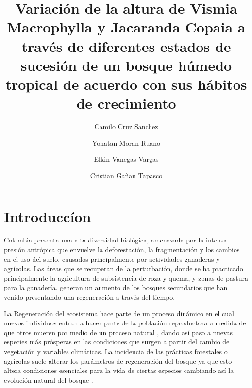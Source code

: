 \documentclass[letterpaper,9pt,onecolumn,twoside,]{pinp}
\title{Variación de la altura de Vismia Macrophylla y Jacaranda Copaia a través
de diferentes estados de sucesión de un bosque húmedo tropical de
acuerdo con sus hábitos de crecimiento}
\author[a]{Camilo Cruz Sanchez}
\author[a]{Yonatan Moran Ruano}
\author[a]{Elkin Vanegas Vargas}
\author[a]{Cristian Gañan Tapasco}
\affil[a]{Departamento de ciencias forestales, Univeridad Nacional de Colombia,
Medellín}
\begin{document}
\verticaladjustment{-2pt}

\maketitle
\thispagestyle{firststyle}



\hypertarget{introduccuxedon}{%
\section{Introduccíon}\label{introduccuxedon}}

Colombia presenta una alta diversidad biológica, amenazada por la
intensa presión antrópica que envuelve la deforestación, la
fragmentación y los cambios en el uso del suelo, causados principalmente
por actividades ganaderas y agrícolas.\citep{salas} Las áreas que se
recuperan de la perturbación, donde se ha practicado principalmente la
agricultura de subsistencia de roza y quema, y zonas de pastura para la
ganadería, generan un aumento de los bosques secundarios\citep{hammer}
que han venido presentando una regeneración a través del tiempo.

La Regeneración del ecosistema hace parte de un proceso dinámico en el
cual nuevos individuos entran a hacer parte de la población reproductora
a medida de que otros mueren por medio de un proceso natural
\citep{pulido}, dando así paso a nuevas especies más prósperas en las
condiciones que surgen a partir del cambio de vegetación y variables
climáticas. La incidencia de las prácticas forestales o agrícolas suele
alterar los parámetros de regeneración del bosque ya que esto altera
condiciones esenciales para la vida de ciertas especies cambiando así la
evolución natural del bosque \citep{pulido}.
\end{document}
